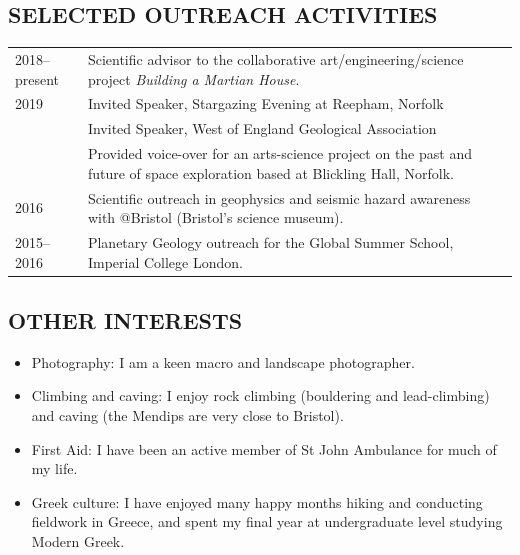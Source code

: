 \documentclass[11pt,twoside,a4paper]{article}
\begin{document}
\clearpage
\subsection*{SELECTED OUTREACH ACTIVITIES}

\vspace{-0.5em}
\begin{table}[!h]
\centering
\begin{tabular}{L{2cm} L{13cm} L{2cm}}
  2018--present \vfill & Scientific advisor to the collaborative art/engineering/science project \emph{Building a Martian House}. & \\
  2019  & Invited Speaker, Stargazing Evening at Reepham, Norfolk \\
  & Invited Speaker, West of England Geological Association \\
   \vfill & Provided voice-over for an arts-science project on the past and future of space exploration based at Blickling Hall, Norfolk. & \\
  2016 \vfill & Scientific outreach in geophysics and seismic hazard awareness with @Bristol (Bristol's science museum). & \\
  2015--2016 \vfill & Planetary Geology outreach for the Global Summer School, Imperial College London. &
\end{tabular}
\end{table}
\vspace{-1.5em}

\subsection*{OTHER INTERESTS}
\begin{itemize}
\item Photography: I am a keen macro and landscape photographer.
\item Climbing and caving: I enjoy rock climbing (bouldering and lead-climbing) and caving (the Mendips are very close to Bristol).
\item First Aid: I have been an active member of St John Ambulance for much of my life.
\item Greek culture: I have enjoyed many happy months hiking and conducting fieldwork in Greece, and spent my final year at undergraduate level studying Modern Greek.
\end{itemize}
\end{document}
